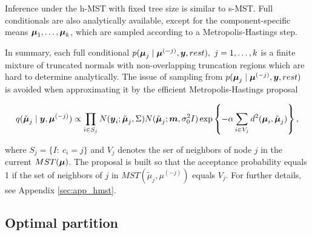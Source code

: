 Inference under the h-MST with fixed tree size is similar to s-MST. Full conditionals are also analytically available, except for the component-specific means $\mbox{\boldmath $\mu$}_1, \ldots, \mbox{\boldmath $\mu$}_k$, which are sampled according to a Metropolis-Hastings step. 

In summary, each full conditional $p(\mbox{\boldmath $\mu$}_j \mid \mbox{\boldmath $\mu$}^{(-j)}, \mbox{\boldmath $y$}, rest), \ j = 1, \ldots, k$ is a finite mixture of truncated normals with non-overlapping truncation regions which are hard to determine analytically. The issue of sampling from $p(\mbox{\boldmath $\mu$}_j \mid \mbox{\boldmath $\mu$}^{(-j)}, \mbox{\boldmath $y$}, rest)$ is avoided when approximating it by the efficient Metropolis-Hastings proposal 

\begin{multline*}
q(\tilde{\mbox{\boldmath $\mu$}}_j \mid \mbox{\boldmath $y$}, \mbox{\boldmath $\mu$}^{(-j)}) \propto \prod_{i\in S_j} N(\mbox{\boldmath $y$}_i; \tilde{\mbox{\boldmath $\mu$}}_{j}, \Sigma) N(\tilde{\mbox{\boldmath $\mu$}}_j; \mbox{\boldmath $m$}, \sigma^2_0I) \exp\left\{-\alpha\sum_{i \in V_j} d^2(\mbox{\boldmath $\mu$}_i, \tilde{\mbox{\boldmath $\mu$}}_j) \right\},
\end{multline*}

\noindent where $S_j = \{I: \ c_i = j\}$ and $V_j$ denotes the ser of neighbors of node $j$ in the current $MST(\mbox{\boldmath $\mu$})$. The proposal is built so that the acceptance probability equals 1 if the set of neighbors of $j$ in $MST(\tilde{\mu}_j, \mu^{(-j)})$ equals $V_j$. For further details, see Appendix \ref{sec:app_hmst}.

\subsection{Optimal partition}

